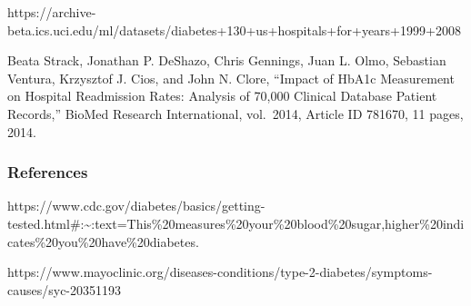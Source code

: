 \documentclass[5p]{elsarticle} %
\begin{document}
https://archive-beta.ics.uci.edu/ml/datasets/diabetes+130+us+hospitals+for+years+1999+2008

Beata Strack, Jonathan P. DeShazo, Chris Gennings, Juan L. Olmo,
Sebastian Ventura, Krzysztof J. Cios, and John N. Clore, ``Impact of
HbA1c Measurement on Hospital Readmission Rates: Analysis of 70,000
Clinical Database Patient Records,'' BioMed Research International,
vol.~2014, Article ID 781670, 11 pages, 2014.

\hypertarget{references}{%
\subsubsection{References}\label{references}}

https://www.cdc.gov/diabetes/basics/getting-tested.html\#:\textasciitilde:text=This\%20measures\%20your\%20blood\%20sugar,higher\%20indicates\%20you\%20have\%20diabetes.

https://www.mayoclinic.org/diseases-conditions/type-2-diabetes/symptoms-causes/syc-20351193
\end{document}
